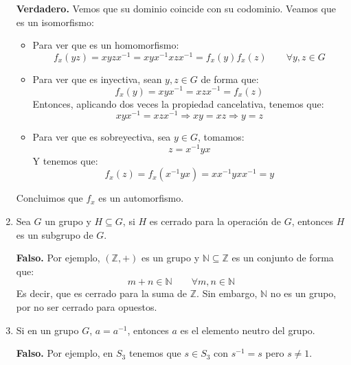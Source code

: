 \documentclass[12pt]{article}
\begin{document}
\begin{ejercicio}
\begin{enumerate}
                \textbf{Verdadero.} Vemos que su dominio coincide con su codominio. Veamos que es un isomorfismo:
                    \begin{itemize}
                        \item Para ver que es un homomorfismo:
                            \begin{equation*}
                                f_x(yz) = xyzx^{-1} = xyx^{-1}xzx^{-1} = f_x(y)f_x(z) \qquad \forall y,z\in G
                            \end{equation*}
                        \item Para ver que es inyectiva, sean $y,z\in G$ de forma que:
                            \begin{equation*}
                                f_x(y) = xyx^{-1} = xzx^{-1} = f_x(z)
                            \end{equation*}
                            Entonces, aplicando dos veces la propiedad cancelativa, tenemos que:
                            \begin{equation*}
                                xyx^{-1} = xzx^{-1} \Longrightarrow xy = xz \Longrightarrow y = z
                            \end{equation*}
                        \item Para ver que es sobreyectiva, sea $y\in G$, tomamos:
                            \begin{equation*}
                                z = x^{-1}yx
                            \end{equation*}
                            Y tenemos que:
                            \begin{equation*}
                                f_x(z) = f_x(x^{-1}yx) = xx^{-1}yxx^{-1} = y
                            \end{equation*}
                    \end{itemize}
                    Concluimos que $f_x$ es un automorfismo.
            \item Sea $G$ un grupo y $H\subseteq G$, si $H$ es cerrado para la operación de $G$, entonces $H$ es un subgrupo de $G$.

                \textbf{Falso.} Por ejemplo, $(\mathbb{Z},+)$ es un grupo y $\mathbb{N}\subseteq \mathbb{Z}$ es un conjunto de forma que:
                \begin{equation*}
                    m+n \in \mathbb{N} \qquad \forall m,n\in \mathbb{N}
                \end{equation*}
                Es decir, que es cerrado para la suma de $\mathbb{Z}$. Sin embargo, $\mathbb{N}$ no es un grupo, por no ser cerrado para opuestos.

            \item Si en un grupo $G$, $a=a^{-1}$, entonces $a$ es el elemento neutro del grupo.
                
                \textbf{Falso.} Por ejemplo, en $S_3$ tenemos que $s\in S_3$ con $s^{-1} = s$ pero $s\neq 1$.
        \end{enumerate}
    \end{ejercicio}
\end{document}

